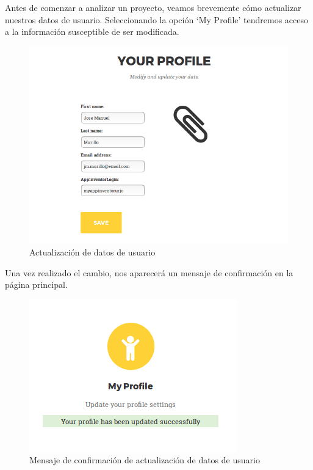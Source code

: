 \documentclass[a4paper, 12pt]{book}
\begin{document}
Antes de comenzar a analizar un proyecto, veamos brevemente cómo actualizar nuestros datos de usuario. Seleccionando la opción `My Profile' tendremos acceso a la información susceptible de ser modificada. 
\begin{figure}[H]
  \centering
  \includegraphics[width=0.70\linewidth, keepaspectratio]{img/profileUpdate}
  \caption{Actualización de datos de usuario}
  \label{fig:profileUpdate}
\end{figure}
Una vez realizado el cambio, nos aparecerá un mensaje de confirmación en la página principal.
\begin{figure}[H]
  \centering
  \includegraphics[width=0.60\linewidth, keepaspectratio]{img/profileUpdateOK}
  \caption{Mensaje de confirmación de actualización de datos de usuario}
  \label{fig:profileUpdateOK}
\end{figure}
\end{document}
